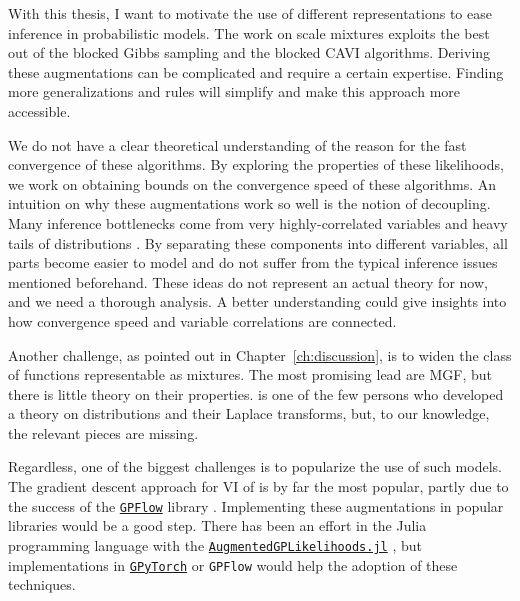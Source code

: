 

\graphicspath{{9_conclusion/figures/}}
With this thesis, I want to motivate the use of different representations to ease inference in probabilistic models.
The work on scale mixtures exploits the best out of the blocked Gibbs sampling and the blocked \ac{CAVI} algorithms.
Deriving these augmentations can be complicated and require a certain expertise.
Finding more generalizations and rules will simplify and make this approach more accessible.

We do not have a clear theoretical understanding of the reason for the fast convergence of these algorithms.
By exploring the properties of these likelihoods, we work on obtaining bounds on the convergence speed of these algorithms.
An intuition on why these augmentations work so well is the notion of decoupling.
Many inference bottlenecks come from very highly-correlated variables and heavy tails of distributions \cite{betancourt2017conceptual}.
By separating these components into different variables, all parts become easier to model and do not suffer from the typical inference issues mentioned beforehand.
These ideas do not represent an actual theory for now, and we need a thorough analysis.
A better understanding could give insights into how convergence speed and variable correlations are connected.

Another challenge, as pointed out in Chapter~\ref{ch:discussion}, is to widen the class of functions representable as mixtures.
The most promising lead are \acf{MGF}, but there is little theory on their properties.
\citet{schwartz1952transformation} is one of the few persons who developed a theory on distributions and their Laplace transforms, but, to our knowledge, the relevant pieces are missing.

Regardless, one of the biggest challenges is to popularize the use of such models.
The gradient descent approach for \ac{VI} of \citet{Hensman2015} is by far the most popular, partly due to the success of the \href{https://github.com/GPflow/GPflow}{\texttt{GPFlow}} library \cite{GPflow2017}.
Implementing these augmentations in popular libraries would be a good step.
There has been an effort in the Julia programming language \cite{Julia-2017} with the \href{https://github.com/JuliaGaussianProcesses/AugmentedGPLikelihoods.jl}{\texttt{AugmentedGPLikelihoods.jl}} \cite{theo_galy_fajou_2022_6347022}, but implementations in \href{https://gpytorch.ai/}{\texttt{GPyTorch}} \cite{gardner2018gpytorch} or \texttt{GPFlow} would help the adoption of these techniques.

